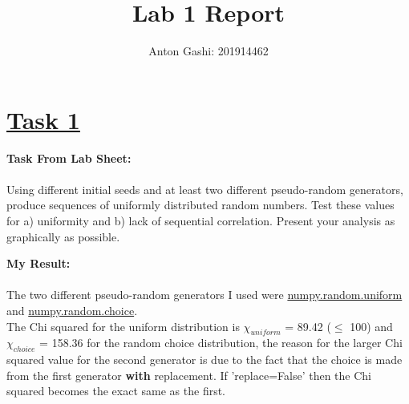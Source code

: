 \documentclass[12pt, A4]{article}
\title{Lab 1 Report}
\author{Anton Gashi: 201914462}
\date
\begin{document}
\begin{titlepage}
\clearpage\maketitle
\thispagestyle{empty}
\end{titlepage}

\section*{\underline{Task 1}}
\hspace{1.5em}\textbf{Task From Lab Sheet:} \\ \\ Using different initial seeds and at least two different pseudo-random generators, produce sequences of uniformly distributed random numbers. Test these values for a) uniformity and b) lack of sequential correlation. Present your analysis as graphically as possible.

\vspace{1.5em}

\textbf{My Result:} \\ \\ The two different pseudo-random generators I used were \href{https://numpy.org/doc/stable/reference/random/generated/numpy.random.uniform.html}{numpy.random.uniform} and \href{https://numpy.org/doc/stable/reference/random/generated/numpy.random.choice.html}{numpy.random.choice}. \\ The Chi squared for the uniform distribution is $\chi_{uniform}$ = 89.42 ($\le$ 100) and $\chi_{choice}$ = 158.36 for the random choice distribution, the reason for the larger Chi squared value for the second generator is due to the fact that the choice is made from the first generator \textbf{with} replacement. If 'replace=False' then the Chi squared becomes the exact same as the first.
\end{document}
